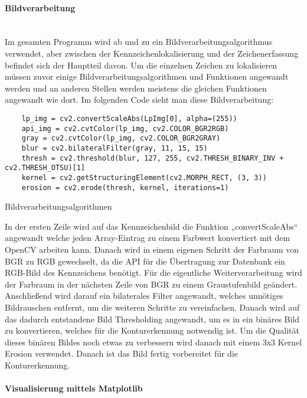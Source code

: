 \paragraph{Bildverarbeitung}\mbox{}\\

Im gesamten Programm wird ab und zu ein Bildverarbeitungsalgorithmus verwendet, aber zwischen der Kennzeichenlokalisierung und der Zeichenerfassung befindet 
sich der Hauptteil davon. Um die einzelnen Zeichen zu lokalisieren müssen zuvor einige Bildverarbeitungsalgorithmen und Funktionen angewandt werden und 
an anderen Stellen werden meistens die gleichen Funktionen angewandt wie dort. Im folgenden Code sieht man diese Bildverarbeitung:

\begin{listing}[H]
    \begin{verbatim}
    lp_img = cv2.convertScaleAbs(LpImg[0], alpha=(255))
    api_img = cv2.cvtColor(lp_img, cv2.COLOR_BGR2RGB)
    gray = cv2.cvtColor(lp_img, cv2.COLOR_BGR2GRAY)
    blur = cv2.bilateralFilter(gray, 11, 15, 15)
    thresh = cv2.threshold(blur, 127, 255, cv2.THRESH_BINARY_INV + cv2.THRESH_OTSU)[1]
    kernel = cv2.getStructuringElement(cv2.MORPH_RECT, (3, 3))
    erosion = cv2.erode(thresh, kernel, iterations=1)
    \end{verbatim}
    \caption{Bildverarbeitungsalgorithmen}
\end{listing}

In der ersten Zeile wird auf das Kennzeichenbild die Funktion „convertScaleAbs“ angewandt welche jeden Array-Eintrag zu einem Farbwert konvertiert mit dem 
OpenCV arbeiten kann. Danach wird in einem eigenen Schritt der Farbraum von BGR zu RGB gewechselt, da die API für die Übertragung zur Datenbank ein RGB-Bild 
des Kennzeichens benötigt. Für die eigentliche Weiterverarbeitung wird der Farbraum in der nächsten Zeile von BGR zu einem Graustufenbild geändert. 
Anschließend wird darauf ein bilaterales Filter angewandt, welches unnötiges Bildrauschen entfernt, um die weiteren Schritte zu vereinfachen. Danach 
wird auf das dadurch entstandene Bild Thresholding angewandt, um es in ein binäres Bild zu konvertieren, welches für die Konturerkennung notwendig ist. 
Um die Qualität dieses binären Bildes noch etwas zu verbessern wird danach mit einem 3x3 Kernel Erosion verwendet. Danach ist das Bild fertig vorbereitet für die Konturerkennung.

\paragraph{Visualisierung mittels Matplotlib}\mbox{}\\


